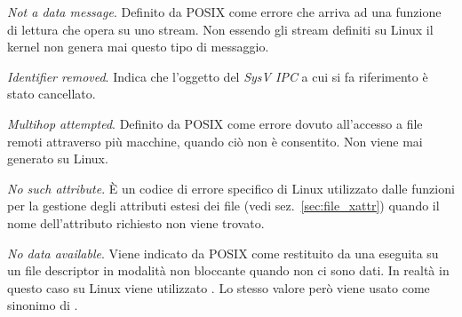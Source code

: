 \begin{basedescript}{\desclabelwidth{1.5cm}\desclabelstyle{\nextlinelabel}}


\item[\errcode{EBADMSG} \textit{Not a data message}.] Definito da POSIX come
errore che arriva ad una funzione di lettura che opera su uno stream. Non
essendo gli stream definiti su Linux il kernel non genera mai questo tipo di
messaggio. 

\item[\errcode{EIDRM} \textit{Identifier removed}.] Indica che l'oggetto del
  \textit{SysV IPC} a cui si fa riferimento è stato cancellato.

\item[\errcode{EMULTIHOP} \textit{Multihop attempted}.] Definito da POSIX come
  errore dovuto all'accesso a file remoti attraverso più macchine, quando ciò
  non è consentito. Non viene mai generato su Linux.

\item[\errcode{ENOATTR} \textit{No such attribute}.] È un codice di errore
  specifico di Linux utilizzato dalle funzioni per la gestione degli attributi
  estesi dei file (vedi sez.~\ref{sec:file_xattr}) quando il nome
  dell'attributo richiesto non viene trovato.

\item[\errcode{ENODATA} \textit{No data available}.] Viene indicato da POSIX
  come restituito da una  eseguita su un file descriptor in
  modalità non bloccante quando non ci sono dati. In realtà in questo caso su
  Linux viene utilizzato . Lo stesso valore però viene usato
  come sinonimo di .


\end{basedescript}
